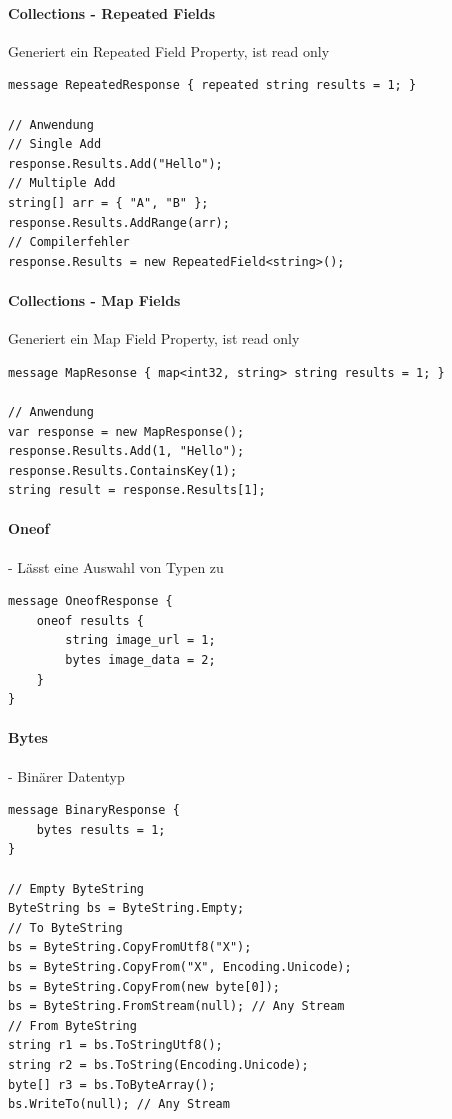 \documentclass[
a4paper,
oneside,
10pt,
fleqn,
headsepline,
toc=listofnumbered, 
bibliography=totocnumbered]{scrartcl}
\begin{document}
\paragraph{Collections - Repeated Fields} Generiert ein Repeated Field Property, ist read only
\begin{lstlisting}
message RepeatedResponse { repeated string results = 1; }

// Anwendung
// Single Add
response.Results.Add("Hello");
// Multiple Add
string[] arr = { "A", "B" };
response.Results.AddRange(arr);
// Compilerfehler
response.Results = new RepeatedField<string>();
\end{lstlisting}

\paragraph{Collections - Map Fields} Generiert ein Map Field Property, ist read only
\begin{lstlisting}
message MapResonse { map<int32, string> string results = 1; }

// Anwendung
var response = new MapResponse();
response.Results.Add(1, "Hello");
response.Results.ContainsKey(1);    
string result = response.Results[1];
\end{lstlisting}


\paragraph{Oneof} - Lässt eine Auswahl von Typen zu
\begin{lstlisting}
message OneofResponse {
    oneof results {
        string image_url = 1;
        bytes image_data = 2;
    }
}
\end{lstlisting}

\paragraph{Bytes} - Binärer Datentyp
\begin{lstlisting}
message BinaryResponse {
    bytes results = 1;
}

// Empty ByteString
ByteString bs = ByteString.Empty;
// To ByteString
bs = ByteString.CopyFromUtf8("X");
bs = ByteString.CopyFrom("X", Encoding.Unicode);
bs = ByteString.CopyFrom(new byte[0]);
bs = ByteString.FromStream(null); // Any Stream
// From ByteString
string r1 = bs.ToStringUtf8();
string r2 = bs.ToString(Encoding.Unicode);
byte[] r3 = bs.ToByteArray();
bs.WriteTo(null); // Any Stream
\end{lstlisting}
\end{document}
